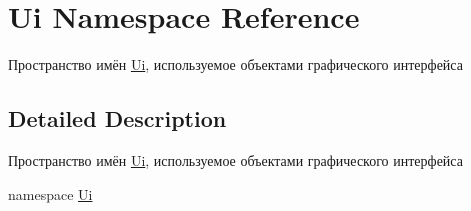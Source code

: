 \hypertarget{namespace_ui}{}\section{Ui Namespace Reference}
\label{namespace_ui}


Пространство имён \hyperlink{namespace_ui}{Ui}, используемое объектами графического интерфейса  




\subsection{Detailed Description}
Пространство имён \hyperlink{namespace_ui}{Ui}, используемое объектами графического интерфейса 

namespace \hyperlink{namespace_ui}{Ui} 